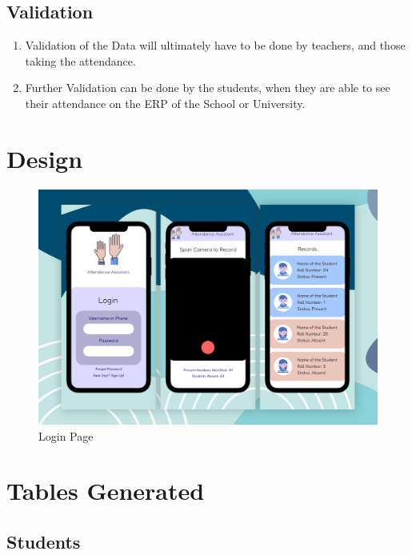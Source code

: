 \documentclass[11pt]{article}
\begin{document}
\subsection{Validation}
\begin{enumerate}
    \item Validation of the Data will ultimately have to be done by teachers, and those taking the attendance.
    \item Further Validation can be done by the students, when they are able to see their attendance on the ERP of the School or University.
\end{enumerate}

\section{Design}
\begin{figure}[H]
    \begin{small}
        \begin{center}
            \includegraphics[scale=0.1]{app.png}
        \end{center}
        \caption{Login Page}
    \end{small}
\end{figure}

\section{Tables Generated}

\subsection{Students}
\end{document}
